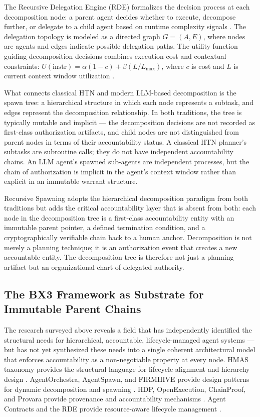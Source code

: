 The Recursive Delegation Engine (RDE) formalizes the decision process at each decomposition node: a parent agent decides whether to execute, decompose further, or delegate to a child agent based on runtime complexity signals \cite{rde2025}. The delegation topology is modeled as a directed graph $G = (A, E)$, where nodes are agents and edges indicate possible delegation paths. The utility function guiding decomposition decisions combines execution cost and contextual constraints: $U(\text{instr}) = \alpha(1 - c) + \beta (L / L_{\max})$, where $c$ is cost and $L$ is current context window utilization \cite{rde2025}.

What connects classical HTN and modern LLM-based decomposition is the spawn tree: a hierarchical structure in which each node represents a subtask, and edges represent the decomposition relationship. In both traditions, the tree is typically mutable and implicit --- the decomposition decisions are not recorded as first-class authorization artifacts, and child nodes are not distinguished from parent nodes in terms of their accountability status. A classical HTN planner's subtasks are subroutine calls; they do not have independent accountability chains. An LLM agent's spawned sub-agents are independent processes, but the chain of authorization is implicit in the agent's context window rather than explicit in an immutable warrant structure.

Recursive Spawning adopts the hierarchical decomposition paradigm from both traditions but adds the critical accountability layer that is absent from both: each node in the decomposition tree is a first-class accountability entity with an immutable parent pointer, a defined termination condition, and a cryptographically verifiable chain back to a human anchor. Decomposition is not merely a planning technique; it is an authorization event that creates a new accountable entity. The decomposition tree is therefore not just a planning artifact but an organizational chart of delegated authority.

\subsection{The BX3 Framework as Substrate for Immutable Parent Chains}

The research surveyed above reveals a field that has independently identified the structural needs for hierarchical, accountable, lifecycle-managed agent systems --- but has not yet synthesized these needs into a single coherent architectural model that enforces accountability as a non-negotiable property at every node. HMAS taxonomy provides the structural language for lifecycle alignment and hierarchy design \cite{moore2025hmas}. AgentOrchestra, AgentSpawn, and FIRMHIVE provide design patterns for dynamic decomposition and spawning \cite{agentorchestra2025, agentspawn2025, firmhive2025}. HDP, OpenExecution, ChainProof, and Provara provide provenance and accountability mechanisms \cite{hdp2026, hdp2025ietf, openexecution2025, chainproof2025, provara2025}. Agent Contracts and the RDE provide resource-aware lifecycle management \cite{agentcontracts2025, rde2025}.

